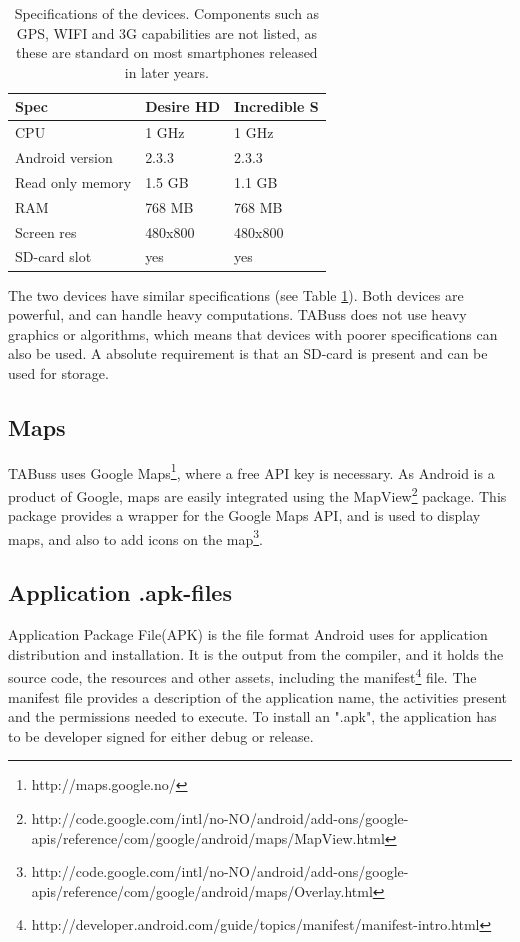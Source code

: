 \begin{table}
\caption{Specifications of the devices. Components such as GPS, WIFI and 3G capabilities are not listed, as these are standard on most smartphones released in later years.}
\label{tab:specs}
\begin{center}
    \begin{tabular}{ |  l  |  l  |  l | }
    \hline
    Spec & Desire HD & Incredible S \\ \hline
    CPU & 1 GHz  & 1 GHz\\ \hline
    Android version & 2.3.3 & 2.3.3 \\ \hline
    Read only memory & 1.5 GB  & 1.1 GB \\ \hline
    RAM &  768 MB & 768 MB \\ \hline
    Screen res & 480x800 & 480x800 \\ \hline
    SD-card slot & yes & yes \\ \hline
    \end{tabular}
\end{center}
\end{table}


The two devices have similar specifications (see Table \ref{tab:specs}).  Both devices are powerful, and can handle heavy computations. TABuss does not use heavy graphics or algorithms, which means that devices with poorer specifications can also be used. A absolute requirement is that an SD-card is present and can be used for storage. 

\subsection{Maps}
\label{sec:maps}
TABuss uses Google Maps\footnote{http://maps.google.no/}, where a free API key is necessary. As Android is a product of Google, maps are easily integrated using the MapView\footnote{http://code.google.com/intl/no-NO/android/add-ons/google-apis/reference/com/google/android/maps/MapView.html} package. This package provides a wrapper for the Google Maps API, and is used to display maps, and also to add icons on the map\footnote{http://code.google.com/intl/no-NO/android/add-ons/google-apis/reference/com/google/android/maps/Overlay.html}.

\subsection{Application .apk-files}
Application Package File(APK) is the file format Android uses for application distribution and installation. It is the output from the compiler, and it holds the source code, the resources and other assets, including the manifest\footnote{http://developer.android.com/guide/topics/manifest/manifest-intro.html} file. The manifest file provides a description of the application name, the activities present and the permissions needed to execute. To install an ".apk", the application has to be developer signed for either debug or release. 



